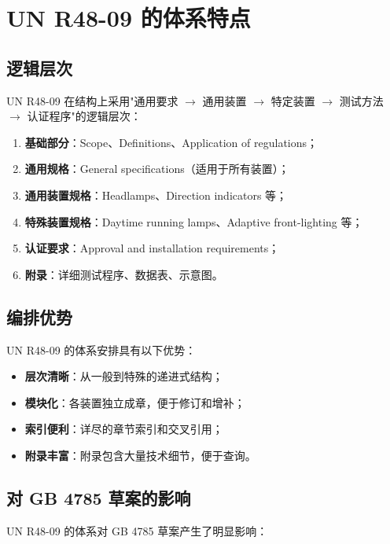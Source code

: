 \section{UN R48-09 的体系特点}

\subsection{逻辑层次}

UN R48-09 在结构上采用"通用要求 $\rightarrow$ 通用装置 $\rightarrow$ 特定装置 $\rightarrow$ 测试方法 $\rightarrow$ 认证程序"的逻辑层次：

\begin{enumerate}[leftmargin=2em]
    \item \textbf{基础部分}：Scope、Definitions、Application of regulations；
    \item \textbf{通用规格}：General specifications（适用于所有装置）；
    \item \textbf{通用装置规格}：Headlamps、Direction indicators 等；
    \item \textbf{特殊装置规格}：Daytime running lamps、Adaptive front-lighting 等；
    \item \textbf{认证要求}：Approval and installation requirements；
    \item \textbf{附录}：详细测试程序、数据表、示意图。
\end{enumerate}

\subsection{编排优势}

UN R48-09 的体系安排具有以下优势：

\begin{itemize}[leftmargin=2em]
    \item \textbf{层次清晰}：从一般到特殊的递进式结构；
    \item \textbf{模块化}：各装置独立成章，便于修订和增补；
    \item \textbf{索引便利}：详尽的章节索引和交叉引用；
    \item \textbf{附录丰富}：附录包含大量技术细节，便于查询。
\end{itemize}

\subsection{对 GB 4785 草案的影响}

UN R48-09 的体系对 GB 4785 草案产生了明显影响：


